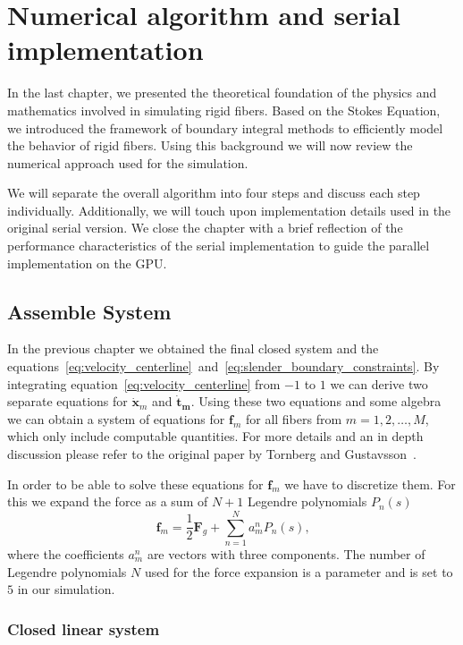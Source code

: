 \chapter{Numerical algorithm and serial implementation}
\label{cha:serial_implementation}

In the last chapter, we presented the theoretical foundation of the physics and mathematics involved in simulating rigid fibers. Based on the Stokes Equation, we introduced the framework of boundary integral methods to efficiently model the behavior of rigid fibers. Using this background we will now review the numerical approach used for the simulation.

We will separate the overall algorithm into four steps and discuss each step individually. Additionally, we will touch upon implementation details used in the original serial version. We close the chapter with a brief reflection of the performance characteristics of the serial implementation to guide the parallel implementation on the GPU.

\section{Assemble System}
In the previous chapter we obtained the final closed system and the equations~\eqref{eq:velocity_centerline}~and~\eqref{eq:slender_boundary_constraints}. By integrating equation~\eqref{eq:velocity_centerline} from $-1$ to $1$ we can derive two separate equations for $\mathbf{\dot{x}}_m$ and $\mathbf{\dot{t}_m}$. Using these two equations and some algebra we can obtain a system of equations for $\mathbf{f}_m$ for all fibers from $m=1,2,\dots,M$, which only include computable quantities. For more details and an in depth discussion please refer to the original paper by Tornberg and Gustavsson~\cite{Tornberg2006}.

In order to be able to solve these equations for $\mathbf{f}_m$ we have to discretize them. For this we expand the force as a sum of $N+1$ Legendre polynomials $P_n(s)$
\begin{equation}
  \label{eq:force_discretization}
  \mathbf{f}_m = \frac{1}{2}\mathbf{F}_g + \sum_{n=1}^{N}a_{m}^{n} P_n(s) \text{,}
\end{equation}
where the coefficients $a_{m}^{n}$ are vectors with three components. The number of Legendre polynomials $N$ used for the force expansion is a parameter and is set to $5$ in our simulation.

\subsection{Closed linear system}
\label{subsec:closed_system}

